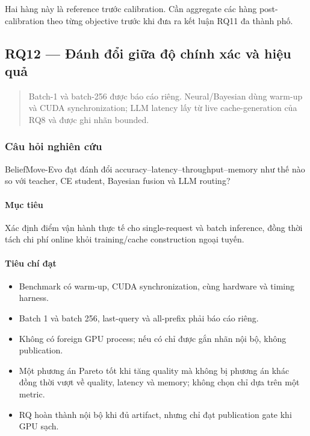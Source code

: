 Hai hàng này là reference trước calibration. Cần aggregate các hàng post-calibration theo từng objective trước khi đưa ra kết luận RQ11 đa thành phố.


\subsection{RQ12 --- Đánh đổi giữa độ chính xác và hiệu quả}

\begin{quote}\small Batch-1 và batch-256 được báo cáo riêng. Neural/Bayesian dùng warm-up và CUDA synchronization; LLM latency lấy từ live cache-generation của RQ8 và được ghi nhãn bounded.\end{quote}
\subsubsection*{Câu hỏi nghiên cứu}

BeliefMove-Evo đạt đánh đổi accuracy--latency--throughput--memory như thế nào so với teacher, CE student, Bayesian fusion và LLM routing?

\paragraph{Mục tiêu}

Xác định điểm vận hành thực tế cho single-request và batch inference, đồng thời tách chi phí online khỏi training/cache construction ngoại tuyến.

\paragraph{Tiêu chí đạt}

\begin{itemize}
\item Benchmark có warm-up, CUDA synchronization, cùng hardware và timing harness.
\item Batch 1 và batch 256, last-query và all-prefix phải báo cáo riêng.
\item Không có foreign GPU process; nếu có chỉ được gắn nhãn nội bộ, không publication.
\item Một phương án Pareto tốt khi tăng quality mà không bị phương án khác đồng thời
vượt về quality, latency và memory; không chọn chỉ dựa trên một metric.

\item RQ hoàn thành nội bộ khi đủ artifact, nhưng chỉ đạt publication gate khi GPU sạch.
\end{itemize}

